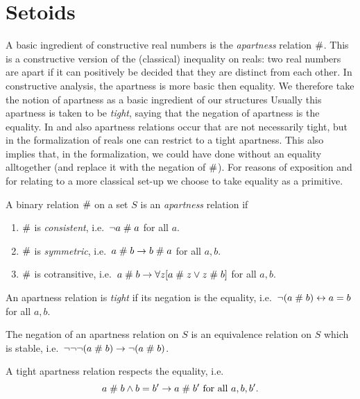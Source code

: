 
\section{Setoids}
A basic ingredient of constructive real numbers is the {\em apartness\/}
relation $\mathrel{\#}$. This is a constructive version of the (classical)
inequality on reals: two real numbers are apart if it can positively
be decided that they are distinct from each other. In constructive analysis, the apartness is more basic then equality. We therefore take
the notion of apartness as a basic ingredient of our structures
Usually this apartness is taken to be {\em tight}, saying that the
negation of
apartness is the equality. In \cite{Ruit82} and \cite{MRR88} also
apartness relations occur that are not necessarily tight, but in the
formalization
of reals one can restrict to a tight apartness. This also implies that,
in the formalization, we could have done without an equality
alltogether (and replace it with the negation of $\mathrel{\#}$). For reasons
of exposition and for relating to a more classical set-up we choose to
take equality as a primitive.

\begin{definition}
A binary relation $\mathrel{\#}$ on a set $S$ is an {\em apartness\/}
relation if
\begin{enumerate}
\item $\mathrel{\#}$ is {\em consistent}, i.e.\ $\neg a \mathrel{\#} a$ for all $a$.
\item $\mathrel{\#}$ is {\em symmetric}, i.e.\ $ a \mathrel{\#} b \rightarrow b \mathrel{\#} a$
for
all $a, b$.
\item $\mathrel{\#}$ is cotransitive, i.e.\ $a\mathrel{\#} b \rightarrow\forall
z[a\mathrel{\#} z \vee z\mathrel{\#} b]$ for all $a, b$.
\end{enumerate}
An apartness relation is {\em tight\/} if its negation is the
equality, i.e.\ $\neg(a\mathrel{\#} b) \leftrightarrow a = b$ for all $a, b$.
\end{definition}

\begin{fact} The negation of an apartness relation on $S$ is an
equivalence relation on $S$ which is stable, i.e.\ $\neg\neg\neg(a\mathrel{\#} b) 
\rightarrow \neg(a\mathrel{\#} b)$.
\end{fact}

\begin{lemma}\label{lemaprespeq}
  A tight apartness relation respects the equality, i.e.
$$a\mathrel{\#} b \wedge b=b' \rightarrow a\mathrel{\#} b' \mbox{ for all } a,b,b'.$$
\end{lemma}

